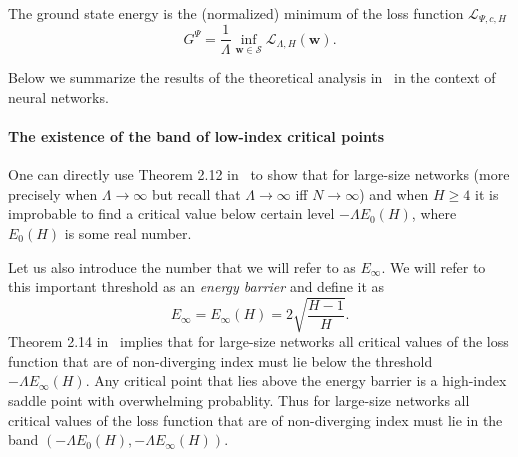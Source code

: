\documentclass[twoside]{article}
\begin{document}
\begin{definition}
The ground state energy is the (normalized) minimum of the loss function $\mathcal{L}_{\Psi,c,H}$
\[G^\Psi = \frac{1}{\Lambda}\inf_{{\bm w}\in \mathcal{S}}\mathcal{L}_{\Lambda,H}({\bm w}).
\]
\end{definition}

Below we summarize the results of the theoretical analysis in~\cite{AAC2010} in the context of neural networks.
\paragraph{The existence of the band of low-index critical points}
One can directly use Theorem 2.12 in~\cite{AAC2010} to show that for large-size networks (more precisely when $\Lambda \rightarrow \infty$ but recall that $\Lambda \rightarrow \infty$ iff $N \rightarrow \infty$) and when $H \geq 4$ it is improbable to find a critical value below certain level $-\Lambda E_0(H)$, where $E_0(H)$ is some real number. 

Let us also  introduce the number that we will refer to as $E_{\infty}$. We will refer to this important threshold as an \textit{energy barrier} and define it as
\[E_{\infty} = E_{\infty}(H) = 2\sqrt{\frac{H-1}{H}}.
\]
Theorem 2.14 in~\cite{AAC2010} implies that for large-size networks all critical values of the loss function that are of non-diverging index must lie below the threshold $-\Lambda E_{\infty}(H)$. Any critical point that lies above the energy barrier is a high-index saddle point with overwhelming probablity. Thus for large-size networks all critical values of the loss function that are of non-diverging index must lie in the band $\left(-\Lambda E_0(H),-\Lambda E_{\infty}(H)\right)$.
\end{document}
